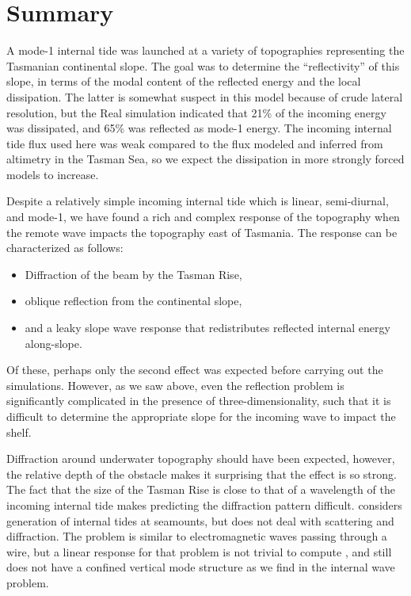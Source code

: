 \documentclass[10pt]{article}
\newcommand{\mn}[1]{{\sc #1}}
\begin{document}
\section{Summary}
\label{sec:Summary}

A mode-1 internal tide was launched at a variety of topographies representing the Tasmanian continental slope.  The goal was to determine the ``reflectivity'' of this slope, in terms of the modal content of the reflected energy and the local dissipation.  The latter is somewhat suspect in this model because of crude lateral resolution, but the \mn{Real} simulation indicated that 21\% of the incoming energy was dissipated, and 65\% was reflected as mode-1 energy.  The incoming internal tide flux used here was  weak compared to the flux modeled and inferred from altimetry in the Tasman Sea, so we expect the dissipation in more strongly forced models to increase.  

Despite a relatively simple incoming internal tide which is linear, semi-diurnal, and mode-1, we have found a rich and complex response of the topography when the remote wave impacts the topography east of Tasmania.  The response can be characterized as follows:
\begin{itemize}
  \item Diffraction of the beam by the Tasman Rise,
  \item oblique reflection from the continental slope,
  \item and a leaky slope wave response that redistributes reflected internal energy along-slope.  
\end{itemize}
Of these, perhaps only the second effect was expected before carrying out the simulations.  However, as we saw above, even the reflection problem is significantly complicated in the presence of three-dimensionality, such that it is difficult to determine the appropriate slope for the incoming wave to impact the shelf.  

Diffraction around underwater topography should have been expected, however, the relative depth of the obstacle makes it surprising that the effect is so strong.  The fact that the size of the Tasman Rise is close to that of a wavelength of the incoming internal tide makes predicting the diffraction pattern difficult.  \citet{baines07} considers generation of internal tides at seamounts, but does not deal with scattering and diffraction.  The problem is similar to electromagnetic waves passing through a wire, but a linear response for that problem is not trivial to compute \citep[i.e.][]{bonod2005differential}, and still does not have a confined vertical mode structure as we find in the internal wave problem.
\end{document}
